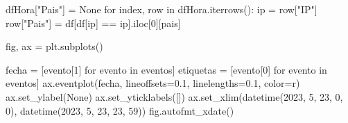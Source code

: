 \documentclass[
  letterpaper,
  DIV=11,
  numbers=noendperiod]{scrartcl}
\newenvironment{Shaded}{\begin{snugshade}}{\end{snugshade}}
\newcommand{\ControlFlowTok}[1]{\textcolor[rgb]{0.00,0.23,0.31}{#1}}
\newcommand{\DecValTok}[1]{\textcolor[rgb]{0.68,0.00,0.00}{#1}}
\newcommand{\FloatTok}[1]{\textcolor[rgb]{0.68,0.00,0.00}{#1}}
\newcommand{\KeywordTok}[1]{\textcolor[rgb]{0.00,0.23,0.31}{#1}}
\newcommand{\NormalTok}[1]{\textcolor[rgb]{0.00,0.23,0.31}{#1}}
\newcommand{\OperatorTok}[1]{\textcolor[rgb]{0.37,0.37,0.37}{#1}}
\newcommand{\StringTok}[1]{\textcolor[rgb]{0.13,0.47,0.30}{#1}}
\newcommand{\VariableTok}[1]{\textcolor[rgb]{0.07,0.07,0.07}{#1}}
\begin{document}
\begin{Shaded}
\begin{Highlighting}[]
\NormalTok{dfHora[}\StringTok{"Pais"}\NormalTok{] }\OperatorTok{=} \VariableTok{None}
\ControlFlowTok{for}\NormalTok{ index, row }\KeywordTok{in}\NormalTok{ dfHora.iterrows():}
\NormalTok{    ip }\OperatorTok{=}\NormalTok{ row[}\StringTok{"IP"}\NormalTok{]}
\NormalTok{    row[}\StringTok{"Pais"}\NormalTok{] }\OperatorTok{=}\NormalTok{ df[df[}\StringTok{\textquotesingle{}ip\textquotesingle{}}\NormalTok{] }\OperatorTok{==}\NormalTok{ ip].iloc[}\DecValTok{0}\NormalTok{][}\StringTok{\textquotesingle{}pais\textquotesingle{}}\NormalTok{]}
\end{Highlighting}
\end{Shaded}

\begin{Shaded}
\begin{Highlighting}[]
\NormalTok{fig, ax }\OperatorTok{=}\NormalTok{ plt.subplots()}

\NormalTok{fecha }\OperatorTok{=}\NormalTok{ [evento[}\DecValTok{1}\NormalTok{] }\ControlFlowTok{for}\NormalTok{ evento }\KeywordTok{in}\NormalTok{ eventos]}
\NormalTok{etiquetas }\OperatorTok{=}\NormalTok{ [evento[}\DecValTok{0}\NormalTok{] }\ControlFlowTok{for}\NormalTok{ evento }\KeywordTok{in}\NormalTok{ eventos]}
\NormalTok{ax.eventplot(fecha, lineoffsets}\OperatorTok{=}\FloatTok{0.1}\NormalTok{, linelengths}\OperatorTok{=}\FloatTok{0.1}\NormalTok{, color}\OperatorTok{=}\StringTok{\textquotesingle{}r\textquotesingle{}}\NormalTok{)}
\NormalTok{ax.set\_ylabel(}\VariableTok{None}\NormalTok{)}
\NormalTok{ax.set\_yticklabels([])}
\NormalTok{ax.set\_xlim(datetime(}\DecValTok{2023}\NormalTok{, }\DecValTok{5}\NormalTok{, }\DecValTok{23}\NormalTok{, }\DecValTok{0}\NormalTok{, }\DecValTok{0}\NormalTok{), datetime(}\DecValTok{2023}\NormalTok{, }\DecValTok{5}\NormalTok{, }\DecValTok{23}\NormalTok{, }\DecValTok{23}\NormalTok{, }\DecValTok{59}\NormalTok{))}
\NormalTok{fig.autofmt\_xdate()}
\end{Highlighting}
\end{Shaded}
\end{document}
